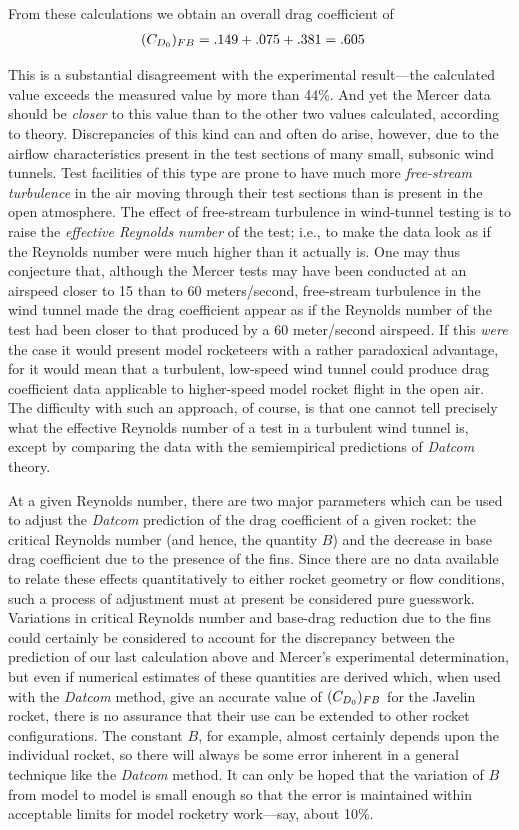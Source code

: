 From these calculations we obtain an overall drag coefficient of
\begin{align*}
(C_{D_0})_{FB} &= .149 + .075 + .381 = .605
\end{align*}

This is a substantial disagreement with the experimental result---the calculated value exceeds the
measured value by more than 44\%. And yet the
Mercer data should be \emph{closer} to this value than to the other two values calculated,
according to theory. Discrepancies of this kind can and often do arise, however, due to the
airflow characteristics present in the test sections of many small, subsonic wind tunnels. Test
facilities of this type are prone to have much more \emph{free-stream turbulence} in the air
moving through their test sections than is present in the open atmosphere. The effect of
free-stream turbulence in wind-tunnel testing is to raise the \emph{effective Reynolds number} of
the test; i.e., to make the data look as if the Reynolds number were much higher than it actually
is. One may thus conjecture that, although the Mercer tests may have been conducted at an airspeed
closer to 15 than to 60 meters/second, free-stream turbulence in the wind tunnel made the drag
coefficient appear as if the Reynolds number of the test had been closer to that produced by a 60
meter/second airspeed. If this \emph{were} the case it would present model rocketeers with a
rather paradoxical advantage, for it would mean that a turbulent, low-speed wind tunnel could
produce drag coefficient data applicable to higher-speed model rocket flight in the open air. The
difficulty with such an approach, of course, is that one cannot tell precisely what the effective
Reynolds number of a test in a turbulent wind tunnel is, except by comparing the data with the
semiempirical predictions of \emph{Datcom} theory.

At a given Reynolds number, there are two major parameters which can be used to adjust the
\emph{Datcom} prediction of the drag coefficient of a given rocket: the critical Reynolds number
(and hence, the quantity $B$) and the decrease in base drag coefficient due to the presence of the
fins. Since there are no data available to relate these effects quantitatively to either rocket
geometry or flow conditions, such a process of adjustment must at present be considered pure
guesswork. Variations in critical Reynolds number and base-drag reduction due to the fins could
certainly be considered to account for the discrepancy between the prediction of our last
calculation above and Mercer's experimental determination, but even if numerical estimates of
these quantities are derived which, when used with the \emph{Datcom} method, give an accurate
value of $(C_{D_0})_{FB}$ for the Javelin rocket, there is no assurance that their use can be
extended to other rocket configurations. The constant $B$, for example, almost certainly depends
upon the individual rocket, so there will always be some error inherent in a general technique
like the \emph{Datcom} method. It can only be hoped that the variation of $B$ from model to model
is small enough so that the error is maintained within acceptable limits for model rocketry
work---say, about 10\%.

